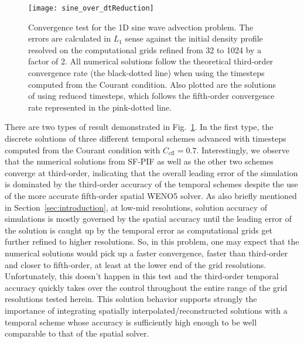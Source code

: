 \documentclass[times,preprint,3p]{elsarticle}
\begin{document}
\begin{figure}[ht!]
    \centering
    \texttt{[image: sine\_over\_dtReduction]}
    \caption{Convergence test for the 1D sine wave advection problem.
        The errors are calculated
        in \( L_{1} \) sense against the initial density profile
        resolved on the computational grids refined
        from 32 to 1024 by a factor of 2.
        All numerical solutions follow the theoretical third-order convergence rate
        (the black-dotted line) when using the timesteps
        computed from the Courant condition.
        Also plotted are the solutions of using reduced timesteps, which follows the
        fifth-order convergence rate represented in the pink-dotted line.
    }\label{fig:1d-order}
\end{figure}


There are two types of result demonstrated in Fig.~\ref{fig:1d-order}.
In the first type, the discrete solutions of three different temporal schemes
advanced with timesteps computed from the Courant condition with $C_{\text{cfl}}=0.7$.
Interestingly, we observe that the numerical solutions from SF-PIF
as well as the other two schemes converge at third-order,
indicating that
the overall
leading error of the simulation is dominated by the third-order accuracy of the
temporal schemes despite the use of the more accurate fifth-order
spatial WENO5 solver.
%
As also briefly mentioned in Section~\ref{sec:introduction}, at low-mid resolutions,
solution accuracy of simulations is mostly governed by the spatial accuracy
until the leading error of the solution is caught up by the temporal error as
computational grids get further refined to higher resolutions.
So, in this problem,
one may expect that the numerical solutions would pick up a faster convergence,
faster than third-order and closer to fifth-order, at least at the lower end of
the grid resolutions.
Unfortunately, this doesn't happen in this test and the third-order
temporal accuracy quickly takes over the control throughout the entire range of
the grid resolutions tested herein. This solution behavior supports strongly the importance
of integrating spatially interpolated/reconstructed solutions with
a temporal scheme whose accuracy is sufficiently high enough to be
well comparable to that of the spatial solver.
\end{document}

